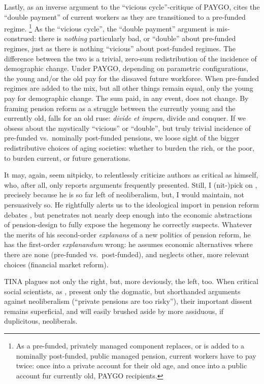 \begin{enumerate}
	Lastly, as an inverse argument to the ``vicious cycle''-critique of PAYGO, \citeauthor{Cerami2009a} cites the ``double payment'' of current workers as they are transitioned to a pre-funded regime.
	\footnote{
		As a pre-funded, privately managed component replaces, or is added to a nominally post-funded, public managed pension, current workers have to pay twice:
		once into a private account for their old age, and once into a public account fur currently old, PAYGO recipients.
	}
	As the ``vicious cycle'', the ``double payment'' argument is mis-construed:
	there is \emph{nothing} particularly bad, or ``double'' about pre-funded regimes, just as there is nothing ``vicious'' about post-funded regimes.
	The difference between the two is a trivial, zero-sum redistribution of the incidence of demographic change.
	Under PAYGO, depending on parametric configurations, the young and/or the old pay for the dissaved future workforce.
	When pre-funded regimes are added to the mix, but all other things remain equal, only the young pay for demographic change.
	The sum paid, in any event, does not change.
	By framing pension reform as a struggle between the currently young and the currently old, \citeauthor{Cerami2009a} falls for an old ruse:
	\emph{divide et impera}, divide and conquer.
	If we obsess about the mystically ``vicious'' or ``double'', but truly trivial incidence of pre-funded vs.\ nominally post-funded pensions, we loose sight of the bigger redistributive choices of aging societies:
	whether to burden the rich, or the poor, to burden current, or future generations.
\end{enumerate}

It may, again, seem nitpicky, to relentlessly criticize authors as critical as \cite{Cerami2009a} himself, who, after all, only reports arguments frequently presented.
Still, I (nit-)pick on \citeauthor{Cerami2009a}, precisely because he is so far left of neoliberalism, but, I would maintain, not persuasively so.
He rightfully alerts us to the ideological import in pension reform debates \citeyearpar[340]{Cerami2009a}, but penetrates not nearly deep enough into the economic abstractions of pension-design to fully expose the hegemony he correctly suspects.
Whatever the merits of his second-order \emph{explanans} of a new politics of pension reform, he has the first-order \emph{explanandum} wrong:
he assumes economic alternatives where there are none (pre-funded vs.\ post-funded), and neglects other, more relevant choices (financial market reform).

TINA plagues not only the right, but, more deviously, the left, too.
When critical social scientists, as \cite{Cerami2009a}, present only the dogmatic, but shorthanded arguments against neoliberalism (``private pensions are too risky''), their important dissent remains superficial, and will easily brushed aside by more assiduous, if duplicitous, neoliberals.

